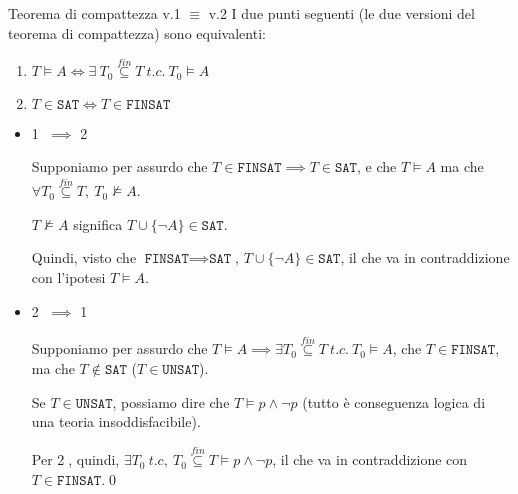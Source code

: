 \documentclass[a4paper,11pt]{report}
\begin{document}
\begin{lemmabox}{Teorema di compattezza v.1 \( \equiv \) v.2}{}
    I due punti seguenti (le due versioni del teorema di compattezza) sono equivalenti:
    \begin{enumerate}
        \item \( T \vDash A \iff \exists \ T_0 \overset{fin}{\subseteq} T \ t.c. \  T_0 \vDash A\)
        \item \( T \in \texttt{SAT} \iff T \in \texttt{FINSAT} \)
    \end{enumerate}

    \begin{pbox}{}
        \begin{itemize}
            \item \textcircled{1} \( \implies \) \textcircled{2}

                Supponiamo per assurdo che \( T \in \texttt{FINSAT} \implies T \in \texttt{SAT} \), e che \( T \vDash A \) ma che \( \forall T_0 \overset{fin}{\subseteq } T, \ T_0 \not\vDash A \).

                \( T \not\vDash A \) significa \( T \cup \{\neg A\} \in \texttt{SAT} \).
                
                Quindi, visto che \( \texttt{FINSAT} \implies \texttt{SAT} \), \( T \cup \{ \neg A\} \in \texttt{SAT}\), il che va in contraddizione con l'ipotesi \( T \vDash A \).
            \item \textcircled{2} \( \implies \) \textcircled{1}

                Supponiamo per assurdo che \( T\vDash A \implies \exists T_0  \overset{fin}{\subseteq } T \ t.c. \ T_0 \vDash A\), che \( T\in \texttt{FINSAT} \), ma che \( T\not \in \texttt{SAT} \) (\( T\in \texttt{UNSAT} \)).

                Se \( T \in \texttt{UNSAT} \), possiamo dire che \( T \vDash p \land \neg p \) {\small \color{gray} (tutto è conseguenza logica di una teoria insoddisfacibile)}.

                Per \textcircled{2}, quindi, \( \exists T_0 \ t.c, \ T_0 \overset{fin}{\subseteq } T \vDash p \land \neg p \), il che va in contraddizione con \( T \in \texttt{FINSAT} \).\qed
        \end{itemize}

    \end{pbox}

\end{lemmabox}
\end{document}
